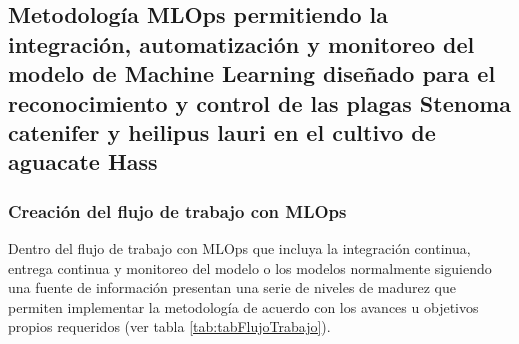 
\subsection{Metodología MLOps permitiendo la integración, automatización y monitoreo del modelo de Machine Learning diseñado para el reconocimiento y control de las plagas Stenoma catenifer y heilipus lauri en el cultivo de aguacate Hass}

\subsubsection{Creación del flujo de trabajo con MLOps}

Dentro del flujo de trabajo con MLOps que incluya la integración continua, entrega continua y monitoreo del modelo o los modelos normalmente siguiendo una fuente de información presentan una serie de niveles de madurez que permiten implementar la metodología de acuerdo con los avances u objetivos propios requeridos (ver tabla \ref{tab:tabFlujoTrabajo}).

